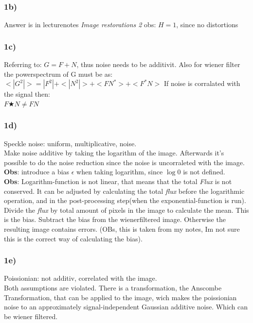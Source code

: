 \documentclass[12pt]{article}
\begin{document}
    \subsubsection*{1b)}
        Answer is in lecturenotes \textit{Image restorations 2}
        obs: $H = 1$, since no distortions\\
    
    \subsubsection*{1c)}
        Referring to:
        $G = F + N$, thus noise needs to be additivit.
        Also for wiener filter the powerspectrum of G must be as: \\    
        $<|G^2|> = |F^2| + <|N^2|> + <FN^*> + <F^*N>$
    If noise is corralated with the signal then:\\
    $F \bigstar N \neq FN$ \\

    \subsubsection*{1d)}
        Speckle noise: uniform, multiplicative, noise.\\
        Make noise additive by taking the logarithm of the image. Afterwards it's possible to do the noise reduction since the noise is uncorraleted with the image.\\ 
        \textbf{Obs}: introduce a bias $\epsilon$ when taking logarithm, since $\log{0}$ is not defined.\\
        \textbf{Obs}: Logarithm-function is not linear, that means that the total \textit{Flux} is not conserved. It can be adjusted by calculating the total \textit{flux} before the logarithmic operation, and in the post-processing step(when the exponential-function is run). Divide the \textit{flux} by total amount of pixels in the image to calculate the mean. This is the bias. Subtract the bias from the wienerfiltered image. Otherwise the resulting image contains errors. (OBs, this is taken from my notes, Im not sure this is the correct way of calculating the bias).
        
        \subsubsection*{1e)}
        Poissionian: not additiv, correlated with the image.
        \\
        Both assumptions are violated.
        There is a transformation, the Anscombe Transformation, that can be applied to the image, wich makes the poissionian noise to an approximately signal-independent Gaussian additive noise. Which can be wiener filtered. 
\end{document}
